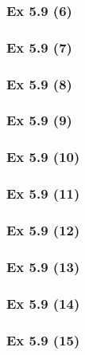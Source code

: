 \subsubsection{Ex 5.9 (6)}\label{sec:Ex_5.9.6}

\subsubsection{Ex 5.9 (7)}\label{sec:Ex_5.9.7}

\subsubsection{Ex 5.9 (8)}\label{sec:Ex_5.9.8}

\subsubsection{Ex 5.9 (9)}\label{sec:Ex_5.9.9}

\subsubsection{Ex 5.9 (10)}\label{sec:Ex_5.9.10}

\newpage		%


\subsubsection{Ex 5.9 (11)}\label{sec:Ex_5.9.11}

\subsubsection{Ex 5.9 (12)}\label{sec:Ex_5.9.12}

\subsubsection{Ex 5.9 (13)}\label{sec:Ex_5.9.13}

\subsubsection{Ex 5.9 (14)}\label{sec:Ex_5.9.14}

\subsubsection{Ex 5.9 (15)}\label{sec:Ex_5.9.15}

